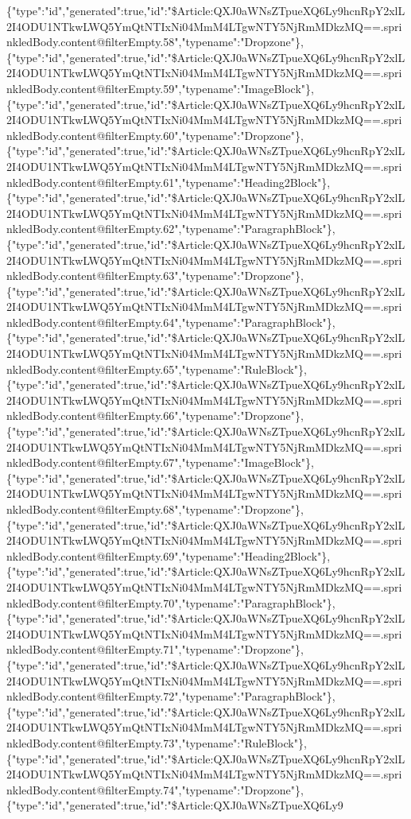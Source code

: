 \{"type":"id","generated":true,"id":"\$Article:QXJ0aWNsZTpueXQ6Ly9hcnRpY2xlL2I4ODU1NTkwLWQ5YmQtNTIxNi04MmM4LTgwNTY5NjRmMDkzMQ==.sprinkledBody.content@filterEmpty.58","typename":"Dropzone"\},\{"type":"id","generated":true,"id":"\$Article:QXJ0aWNsZTpueXQ6Ly9hcnRpY2xlL2I4ODU1NTkwLWQ5YmQtNTIxNi04MmM4LTgwNTY5NjRmMDkzMQ==.sprinkledBody.content@filterEmpty.59","typename":"ImageBlock"\},\{"type":"id","generated":true,"id":"\$Article:QXJ0aWNsZTpueXQ6Ly9hcnRpY2xlL2I4ODU1NTkwLWQ5YmQtNTIxNi04MmM4LTgwNTY5NjRmMDkzMQ==.sprinkledBody.content@filterEmpty.60","typename":"Dropzone"\},\{"type":"id","generated":true,"id":"\$Article:QXJ0aWNsZTpueXQ6Ly9hcnRpY2xlL2I4ODU1NTkwLWQ5YmQtNTIxNi04MmM4LTgwNTY5NjRmMDkzMQ==.sprinkledBody.content@filterEmpty.61","typename":"Heading2Block"\},\{"type":"id","generated":true,"id":"\$Article:QXJ0aWNsZTpueXQ6Ly9hcnRpY2xlL2I4ODU1NTkwLWQ5YmQtNTIxNi04MmM4LTgwNTY5NjRmMDkzMQ==.sprinkledBody.content@filterEmpty.62","typename":"ParagraphBlock"\},\{"type":"id","generated":true,"id":"\$Article:QXJ0aWNsZTpueXQ6Ly9hcnRpY2xlL2I4ODU1NTkwLWQ5YmQtNTIxNi04MmM4LTgwNTY5NjRmMDkzMQ==.sprinkledBody.content@filterEmpty.63","typename":"Dropzone"\},\{"type":"id","generated":true,"id":"\$Article:QXJ0aWNsZTpueXQ6Ly9hcnRpY2xlL2I4ODU1NTkwLWQ5YmQtNTIxNi04MmM4LTgwNTY5NjRmMDkzMQ==.sprinkledBody.content@filterEmpty.64","typename":"ParagraphBlock"\},\{"type":"id","generated":true,"id":"\$Article:QXJ0aWNsZTpueXQ6Ly9hcnRpY2xlL2I4ODU1NTkwLWQ5YmQtNTIxNi04MmM4LTgwNTY5NjRmMDkzMQ==.sprinkledBody.content@filterEmpty.65","typename":"RuleBlock"\},\{"type":"id","generated":true,"id":"\$Article:QXJ0aWNsZTpueXQ6Ly9hcnRpY2xlL2I4ODU1NTkwLWQ5YmQtNTIxNi04MmM4LTgwNTY5NjRmMDkzMQ==.sprinkledBody.content@filterEmpty.66","typename":"Dropzone"\},\{"type":"id","generated":true,"id":"\$Article:QXJ0aWNsZTpueXQ6Ly9hcnRpY2xlL2I4ODU1NTkwLWQ5YmQtNTIxNi04MmM4LTgwNTY5NjRmMDkzMQ==.sprinkledBody.content@filterEmpty.67","typename":"ImageBlock"\},\{"type":"id","generated":true,"id":"\$Article:QXJ0aWNsZTpueXQ6Ly9hcnRpY2xlL2I4ODU1NTkwLWQ5YmQtNTIxNi04MmM4LTgwNTY5NjRmMDkzMQ==.sprinkledBody.content@filterEmpty.68","typename":"Dropzone"\},\{"type":"id","generated":true,"id":"\$Article:QXJ0aWNsZTpueXQ6Ly9hcnRpY2xlL2I4ODU1NTkwLWQ5YmQtNTIxNi04MmM4LTgwNTY5NjRmMDkzMQ==.sprinkledBody.content@filterEmpty.69","typename":"Heading2Block"\},\{"type":"id","generated":true,"id":"\$Article:QXJ0aWNsZTpueXQ6Ly9hcnRpY2xlL2I4ODU1NTkwLWQ5YmQtNTIxNi04MmM4LTgwNTY5NjRmMDkzMQ==.sprinkledBody.content@filterEmpty.70","typename":"ParagraphBlock"\},\{"type":"id","generated":true,"id":"\$Article:QXJ0aWNsZTpueXQ6Ly9hcnRpY2xlL2I4ODU1NTkwLWQ5YmQtNTIxNi04MmM4LTgwNTY5NjRmMDkzMQ==.sprinkledBody.content@filterEmpty.71","typename":"Dropzone"\},\{"type":"id","generated":true,"id":"\$Article:QXJ0aWNsZTpueXQ6Ly9hcnRpY2xlL2I4ODU1NTkwLWQ5YmQtNTIxNi04MmM4LTgwNTY5NjRmMDkzMQ==.sprinkledBody.content@filterEmpty.72","typename":"ParagraphBlock"\},\{"type":"id","generated":true,"id":"\$Article:QXJ0aWNsZTpueXQ6Ly9hcnRpY2xlL2I4ODU1NTkwLWQ5YmQtNTIxNi04MmM4LTgwNTY5NjRmMDkzMQ==.sprinkledBody.content@filterEmpty.73","typename":"RuleBlock"\},\{"type":"id","generated":true,"id":"\$Article:QXJ0aWNsZTpueXQ6Ly9hcnRpY2xlL2I4ODU1NTkwLWQ5YmQtNTIxNi04MmM4LTgwNTY5NjRmMDkzMQ==.sprinkledBody.content@filterEmpty.74","typename":"Dropzone"\},\{"type":"id","generated":true,"id":"\$Article:QXJ0aWNsZTpueXQ6Ly9
